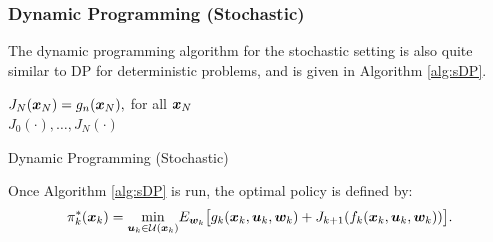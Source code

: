 \subsubsection{Dynamic Programming (Stochastic)}
The dynamic programming algorithm for the stochastic setting is also quite similar to DP for deterministic problems, and is given in Algorithm \ref{alg:sDP}.
\begin{algorithm}[ht]
 $J_N(\bm{x}_N) = g_n(\bm{x}_N),$ for all $\bm{x}_N$\\
 \Return $J_0(\cdot),\dots,J_N(\cdot)$
 \caption{Dynamic Programming (Stochastic)}
 \label{alg:sDP}
\end{algorithm}
Once Algorithm \ref{alg:sDP} is run, the optimal policy is defined by:
\begin{equation*}
\pi^*_k(\bm{x}_k) = \underset{\bm{u}_k \in \mathcal{U}(\bm{x}_k)}{\min}E_{\bm{w}_k}\big[g_k(\bm{x}_k,\bm{u}_k,\bm{w}_k) + J_{k+1}(f_k(\bm{x}_k, \bm{u}_k, \bm{w}_k))\big].
\end{equation*}

